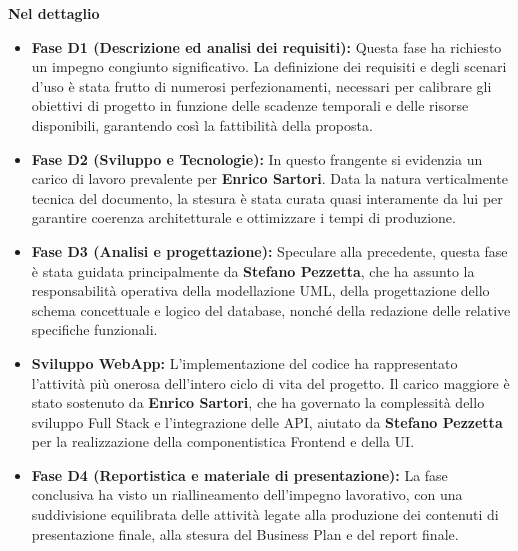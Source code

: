 \textbf{Nel dettaglio}

\begin{itemize}
    \item \textbf{Fase D1 (Descrizione ed analisi dei requisiti):} Questa fase ha richiesto un impegno congiunto significativo. La definizione dei requisiti e degli scenari d'uso è stata frutto di numerosi perfezionamenti, necessari per calibrare gli obiettivi di progetto in funzione delle scadenze temporali e delle risorse disponibili, garantendo così la fattibilità della proposta.
    
    \item \textbf{Fase D2 (Sviluppo e Tecnologie):} In questo frangente si evidenzia un carico di lavoro prevalente per \textbf{Enrico Sartori}. Data la natura verticalmente tecnica del documento, la stesura è stata curata quasi interamente da lui per garantire coerenza architetturale e ottimizzare i tempi di produzione.

    \item \textbf{Fase D3 (Analisi e progettazione):} Speculare alla precedente, questa fase è stata guidata principalmente da \textbf{Stefano Pezzetta}, che ha assunto la responsabilità operativa della modellazione UML, della progettazione dello schema concettuale e logico del database, nonché della redazione delle relative specifiche funzionali.

    \item \textbf{Sviluppo WebApp:} L'implementazione del codice ha rappresentato l'attività più onerosa dell'intero ciclo di vita del progetto. Il carico maggiore è stato sostenuto da \textbf{Enrico Sartori}, che ha governato la complessità dello sviluppo Full Stack e l'integrazione delle API, aiutato da \textbf{Stefano Pezzetta} per la realizzazione della componentistica Frontend e della UI.

    \item \textbf{Fase D4 (Reportistica e materiale di presentazione):} La fase conclusiva ha visto un riallineamento dell'impegno lavorativo, con una suddivisione equilibrata delle attività legate alla produzione dei contenuti di presentazione finale, alla stesura del Business Plan e del report finale.
\end{itemize}

